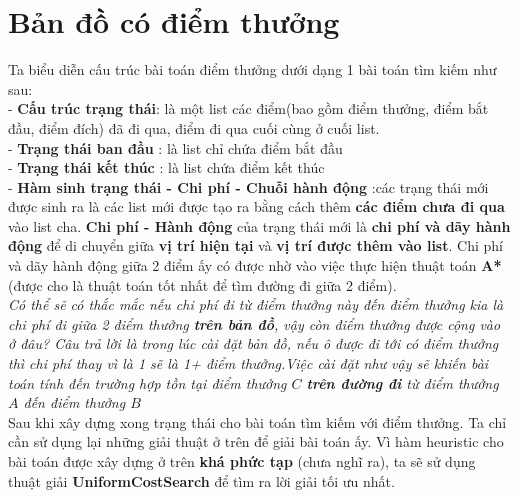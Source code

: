 \documentclass[11pt]{scrartcl} %
\begin{document}
\section{Bản đồ có điểm thưởng}
Ta biểu diễn cấu trúc bài toán điểm thưởng dưới dạng 1 bài toán tìm kiếm như sau:\\
- \textbf{Cấu trúc trạng thái}: là một list các điểm(bao gồm điểm thưởng, điểm bắt đầu, điểm đích) đã đi qua, điểm đi qua cuối cùng ở cuối list. \\
- \textbf{Trạng thái ban đầu} : là  list chỉ chứa điểm bắt đầu\\
- \textbf{Trạng thái kết thúc} : là list chứa điểm kết thúc\\
- \textbf{Hàm sinh trạng thái - Chi phí - Chuỗi hành động} :các trạng thái mới được sinh ra là các list mới được tạo ra bằng cách thêm \textbf{các điểm chưa đi qua} vào list cha. \textbf{Chi phí - Hành động} của trạng thái mới là \textbf{chi phí và dãy hành động} để di chuyển giữa \textbf{vị trí hiện tại} và \textbf{vị trí được thêm vào list}. Chi phí và dãy hành động giữa 2 điểm ấy có được nhờ vào việc thực hiện thuật toán \textbf{A*} (được cho là thuật toán tốt nhất để tìm đường đi giữa 2 điểm).\\
\emph{Có thể sẽ có thắc mắc nếu chi phí đi từ điểm thưởng này đến điểm thưởng kia là chi phí đi giữa 2 điểm thưởng \textbf{trên bản đồ}, vậy còn điểm thưởng được cộng vào ở đâu? Câu trả lời là trong lúc cài đặt bản đồ, nếu ô được đi tới có điểm thưởng thì chi phí thay vì là 1 sẽ là 1+ điểm thưởng.Việc cài đặt như vậy sẽ khiến bài toán tính đến trường hợp tồn tại điểm thưởng $C$ \textbf{trên đường đi} từ điểm thưởng $A$ đến điểm thưởng $B$}\\
Sau khi xây dựng xong trạng thái cho bài toán tìm kiếm với điểm thưởng. Ta chỉ cần sử dụng lại những giải thuật ở trên để giải bài toán ấy. Vì hàm heuristic cho bài toán được xây dựng ở trên \textbf{khá phức tạp} (chưa nghĩ ra), ta sẽ sử dụng thuật giải \textbf{UniformCostSearch} để tìm ra lời giải tối ưu nhất.\\
\end{document}
